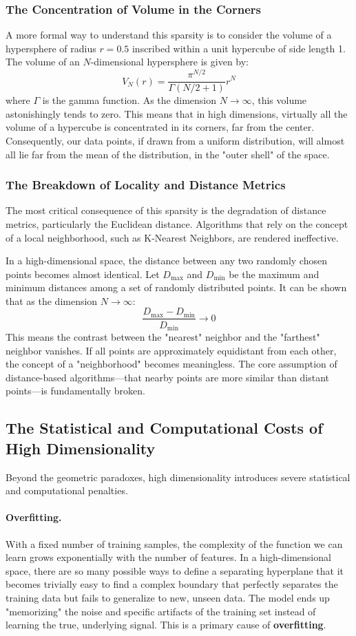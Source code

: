 \begin{itemize}
\subsubsection{The Concentration of Volume in the Corners}
A more formal way to understand this sparsity is to consider the volume of a hypersphere of radius $r=0.5$ inscribed within a unit hypercube of side length 1. The volume of an $N$-dimensional hypersphere is given by:
$$ V_N(r) = \frac{\pi^{N/2}}{\Gamma(N/2 + 1)}r^N $$
where $\Gamma$ is the gamma function. As the dimension $N \to \infty$, this volume astonishingly tends to zero. This means that in high dimensions, virtually all the volume of a hypercube is concentrated in its corners, far from the center. Consequently, our data points, if drawn from a uniform distribution, will almost all lie far from the mean of the distribution, in the "outer shell" of the space.

\subsubsection{The Breakdown of Locality and Distance Metrics}
The most critical consequence of this sparsity is the degradation of distance metrics, particularly the Euclidean distance. Algorithms that rely on the concept of a local neighborhood, such as K-Nearest Neighbors, are rendered ineffective.

In a high-dimensional space, the distance between any two randomly chosen points becomes almost identical. Let $D_{\max}$ and $D_{\min}$ be the maximum and minimum distances among a set of randomly distributed points. It can be shown that as the dimension $N \to \infty$:
$$ \frac{D_{\max} - D_{\min}}{D_{\min}} \to 0 $$
This means the contrast between the "nearest" neighbor and the "farthest" neighbor vanishes. If all points are approximately equidistant from each other, the concept of a "neighborhood" becomes meaningless. The core assumption of distance-based algorithms—that nearby points are more similar than distant points—is fundamentally broken.

\subsection{The Statistical and Computational Costs of High Dimensionality}
Beyond the geometric paradoxes, high dimensionality introduces severe statistical and computational penalties.

\paragraph{Overfitting.} With a fixed number of training samples, the complexity of the function we can learn grows exponentially with the number of features. In a high-dimensional space, there are so many possible ways to define a separating hyperplane that it becomes trivially easy to find a complex boundary that perfectly separates the training data but fails to generalize to new, unseen data. The model ends up "memorizing" the noise and specific artifacts of the training set instead of learning the true, underlying signal. This is a primary cause of \textbf{overfitting}.


\end{itemize}
